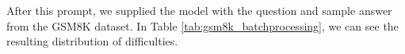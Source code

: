 After this prompt, we supplied the model with the question and sample answer from the GSM8K dataset. In Table \ref{tab:gsm8k_batchprocessing}, we can see the resulting distribution of difficulties.


